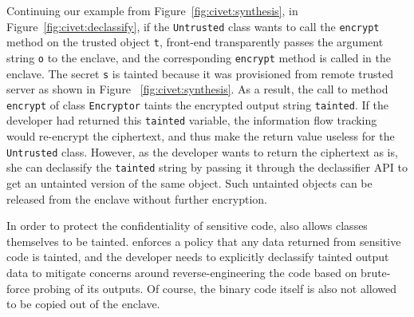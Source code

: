 Continuing our example from Figure~\ref{fig:civet:synthesis}, in Figure~\ref{fig:civet:declassify}, if the {\tt Untrusted} class wants to call the {\tt encrypt} method on the trusted object {\tt t}, \sysname{} front-end transparently passes the argument string {\tt o} to the enclave, and the corresponding {\tt encrypt} method is called in the enclave. The secret {\tt s} is tainted because it was provisioned from remote trusted server as shown in Figure ~\ref{fig:civet:synthesis}. As a result, the call to method {\tt encrypt} of class {\tt Encryptor} taints the encrypted output string {\tt tainted}. If the developer had returned this {\tt tainted} variable, the \sysname{} information flow tracking would re-encrypt the ciphertext, and thus make the return value useless for the {\tt Untrusted} class. However, as the developer wants to return the ciphertext as is, she can declassify the {\tt tainted} string by passing it through the declassifier API to get an untainted version of the same object. Such untainted objects can be released from the enclave without further encryption.


In order to protect the confidentiality of sensitive code,
\sysname{} also allows classes themselves to be tainted.
\sysname{} enforces a policy that any data returned from sensitive code is tainted, and the developer needs to explicitly declassify tainted output data to mitigate
concerns around reverse-engineering the code based on brute-force probing of its outputs.
Of course, the binary code itself is also not allowed to be copied out of the enclave.


%
